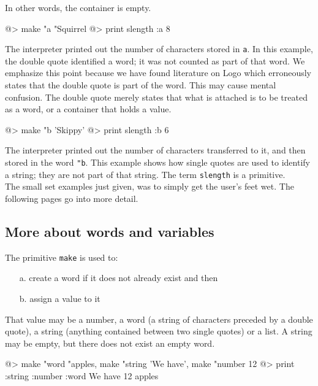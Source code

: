 In other words, the container is empty. 
 
\begin{verbatimtab}
@> make "a "Squirrel 
@> print slength :a 
8
\end{verbatimtab}

The interpreter printed out the number of characters stored in \verb+a+.  In this example, the double quote identified a word; it was not counted as part of that word.  We emphasize this point because we have found literature on Logo which erroneously states that the double quote is part of the word.  This may cause mental confusion.  The double quote merely states that what is attached is to be treated as a word, or a container that holds a value.\\

\begin{verbatimtab}
@> make "b 'Skippy' 
@> print slength :b
6
\end{verbatimtab}

The interpreter printed out the number of characters transferred to it, and then stored in the word \verb+"b+.  This example shows how single quotes are used to identify a string; they are not part of that string. The term {\tt slength} is a primitive.\\

The small set examples just given, was to simply get the user's feet wet.  The following pages go into more detail. 

\subsection{More about words and variables} 

The primitive \verb+make+ is used to: 
 
\begin{enumerate}
\item[a.] create a word if it does not already exist and then  
\item[b.] assign a value to it
\end{enumerate} 
 
That value may be a number, a word (a string of characters preceded by a double quote), a string (anything contained between two single quotes) or a list. A string may be empty, but there does not exist an empty word.\\

\begin{verbatimtab}
@> make "word "apples, make "string 'We have', make "number 12
@> print :string :number :word
We have 12 apples
\end{verbatimtab}

